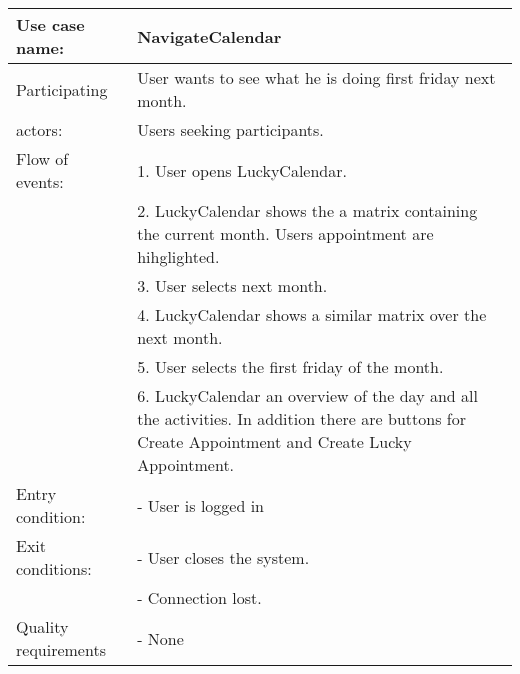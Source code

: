{\tabulinesep=1.2mm
\begin{tabu}{ | p{3cm} | p{13cm} |}
    \hline
    Use case name: 			& 		NavigateCalendar\\ \hline
    Participating  			& 		User wants to see what he is doing first friday next month. \\
    actors:					&		Users seeking participants.\\ \hline
    Flow of events: 		& 		1. User opens LuckyCalendar. \\
							&		2. LuckyCalendar shows the a matrix containing the current month. Users appointment are hihglighted.\\
							&		3. User selects next month.\\
							&		4. LuckyCalendar shows a similar matrix over the next month.\\
							&		5. User selects the first friday of the month.\\
							&		6. LuckyCalendar an overview of the day and all the activities. In addition there are buttons for Create Appointment and Create Lucky Appointment.\\ \hline
    Entry condition: 		& 		- User is logged in  \\ \hline
	Exit conditions: 		&		- User closes the system.\\
							&		- Connection lost.\\\hline
	Quality requirements	&	 	- None \\\hline
\end{tabu}
}